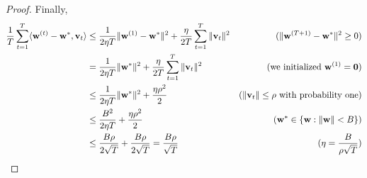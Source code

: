 \documentclass{article}
\begin{document}
\begin{proof}
 Finally, 
   \begin{align}
\dfrac{1}{T} \sum_{t=1}^T  \langle {\bf w}^{(t)} - {\bf w}^\ast, {\bf v}_t\rangle
&\leq  \dfrac{1}{2\eta T}     \| {\bf w}^{(1)} - {\bf w}^\ast \|^2    +  \dfrac{\eta}{2T} \sum_{t=1}^T   \| {\bf v}_t  \|^2 & (\| {\bf w}^{(T+1)} - {\bf w}^\ast   \|^2 \geq 0 ) \nonumber \\
&=  \dfrac{1}{2\eta T}     \| {\bf w}^\ast \|^2    +  \dfrac{\eta}{2T} \sum_{t=1}^T   \| {\bf v}_t  \|^2 & (\text{we initialized } {\bf w}^{(1)} = {\bf 0}) \nonumber \\
&\leq  \dfrac{1}{2\eta T}     \| {\bf w}^\ast \|^2    +  \dfrac{\eta \rho^2}{2}    & (\|{\bf v}_{t}\|\leq \rho \text{ with probability one}) \nonumber \\
&\leq  \dfrac{B^2}{2\eta T}        +  \dfrac{\eta \rho^2 }{2}    & ({\bf w}^\ast \in \{ {\bf w}: \|{\bf w}\|<B \}) \nonumber \\
&\leq  \dfrac{B \rho}{2\sqrt{T}}        +  \dfrac{ B\rho }{2\sqrt{T}} = \dfrac{ B\rho }{\sqrt{T}}    & ( \eta = \frac{B}{\rho\sqrt{T}}) 
 \end{align}

 
 \end{proof}







\end{document}
